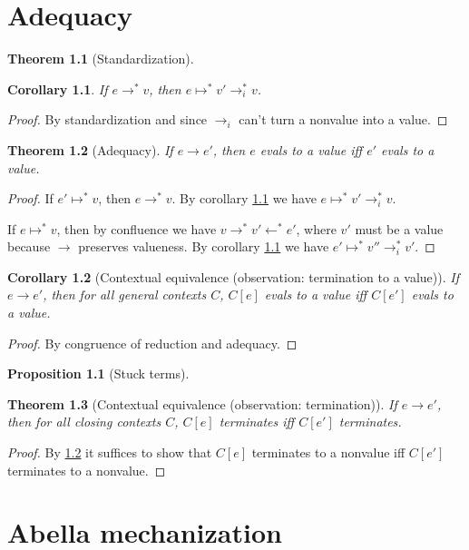 \documentclass[a4paper, 11pt,titlepage, openright, twoside]{report}
\newcommand{\+}{\enspace}
\newtheorem{corollary}{Corollary}
\newtheorem{theorem}{Theorem}
\newtheorem{prop}{Proposition}
\begin{document}
\chapter{Adequacy}

\begin{theorem}[Standardization]
\end{theorem}
\begin{corollary} If $e →^* v$, then $e ↦^* v' →_i^* v$.
	\label{stanv}
\end{corollary}
\begin{proof}
	By standardization and since $→_i$ can't turn a nonvalue into a value.
\end{proof}


\begin{theorem}[Adequacy]
	If $e → e'$, then $e$ evals to a value iff $e'$ evals to a value.
\end{theorem}
\begin{proof}
	If $e' ↦^* v$, then $e →^* v$. By corollary \ref{stanv} we have $e ↦^* v' →_i^* v$.

	If $e ↦^* v$, then by confluence we have $v →^* v' ←^* e'$, where $v'$ must be a value
	because $→$ preserves valueness. By corollary \ref{stanv} we have $e' ↦^* v'' →_i^* v'$.
\end{proof}

\begin{corollary}[Contextual equivalence (observation: termination to a value)]
	If $e → e'$, then for all general contexts $C$, $C[e]$ evals to a value iff $C[e']$ evals to a value.
	\label{ctxeqv1}
\end{corollary}
\begin{proof}
	By congruence of reduction and adequacy.
\end{proof}

\begin{prop}[Stuck terms]
\end{prop}

\begin{theorem}[Contextual equivalence (observation: termination)]
	If $e → e'$, then for all closing contexts $C$, $C[e]$ terminates iff $C[e']$ terminates.
\end{theorem}
\begin{proof}
	By \ref{ctxeqv1} it suffices to show that
	$C[e]$ terminates to a nonvalue iff $C[e']$ terminates to a nonvalue.
\end{proof}

\chapter{Abella mechanization}
\end{document}
